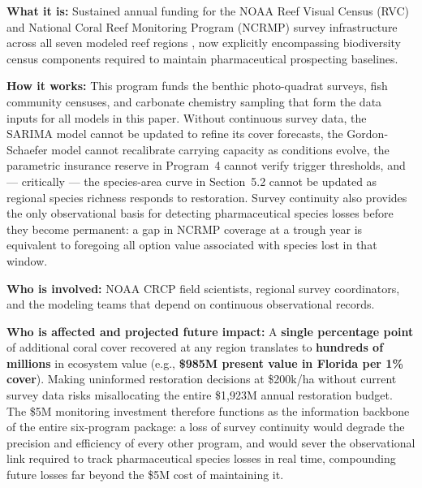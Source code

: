 \documentclass[10pt,letterpaper]{article}
\newcounter{metric}
\begin{document}
\begin{tcolorbox}[title=Program 2: NOAA Reef Survey Funding --- \$5M Annual Total,
  colback=green!5, colframe=green!50!black, fonttitle=\bfseries, breakable]

  \textbf{What it is:} Sustained annual funding for the NOAA Reef Visual Census (RVC) and
  National Coral Reef Monitoring Program (NCRMP) survey infrastructure across all seven modeled
  reef regions \cite{noaa_rvc, noaa_ncrmp}, now explicitly encompassing biodiversity census
  components required to maintain pharmaceutical prospecting baselines.

  \medskip
  \textbf{How it works:} This program funds the benthic photo-quadrat surveys, fish community
  censuses, and carbonate chemistry sampling that form the data inputs for all models in this
  paper. Without continuous survey data, the SARIMA model cannot be updated to refine its cover
  forecasts, the Gordon-Schaefer model cannot recalibrate carrying capacity as conditions evolve,
  the parametric insurance reserve in Program~4 cannot verify trigger thresholds, and --- critically
  --- the species-area curve in Section~5.2 cannot be updated as regional species richness
  responds to restoration. Survey continuity also provides the only observational basis for
  detecting pharmaceutical species losses before they become permanent: a gap in NCRMP coverage
  at a trough year is equivalent to foregoing all option value associated with species lost in
  that window.

  \medskip
  \textbf{Who is involved:} NOAA CRCP field scientists, regional survey coordinators, and the
  modeling teams that depend on continuous observational records.

  \medskip
  \textbf{Who is affected and projected future impact:} A \textbf{single percentage point} of
  additional coral cover recovered at any region translates to \textbf{hundreds of millions} in
  ecosystem value (e.g., \textbf{\$985M present value in Florida per 1\% cover}). Making
  uninformed restoration decisions at \$200k/ha without current survey data risks misallocating
  the entire \$1,923M annual restoration budget. The \$5M monitoring investment therefore
  functions as the information backbone of the entire six-program package: a loss of survey
  continuity would degrade the precision and efficiency of every other program, and would sever
  the observational link required to track pharmaceutical species losses in real time, compounding
  future losses far beyond the \$5M cost of maintaining it.
\end{tcolorbox}
\end{document}
